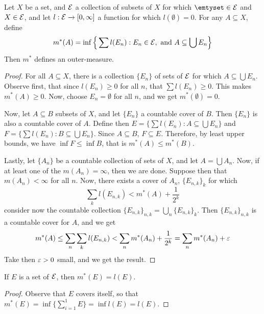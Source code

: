\begin{lemma}\label{lemma_1.3.1}
    Let $X$ be a set, and  $\mathcal{E}$ a collection of subsets of $X$ for which
    $\emtyset \in \Ec$ and $X \in \mathcal{E}$, and let $l:\mathcal{E} \xrightarrow{} [0, \infty]$
    a function for which $l(\emptyset)=0$. For any $A \subseteq X$, define
    \begin{equation}\label{equation_1.4}
        m^\ast(A)=\inf{\Big{\{} \sum{l(E_n)} : E_n \in \mathcal{E}, \text{ and }
       A \subseteq \bigcup{E_n} \Big{\}}}
    \end{equation}
    Then $m^\ast$ defines an outer-measure.
\end{lemma}
\begin{proof}
    For all $A \subseteq X$, there is a collection $\{E_n\}$ of sets of $\mathcal{E}$
    for which $A \subseteq \bigcup{E_n}$. Observe first, that since $l(E_n) \geq
    0$ for all $n$, that  $\sum{l(E_n)} \geq 0$. This makes $m^\ast(A) \geq 0$.
    Now, choose $E_n=\emptyset$ for all  $n$, and we get  $m^\ast(\emptyset)=0$.

    Now, let $A \subseteq B$ subsets of $X$, and let  $\{E_n\}$ a countable
    cover of $B$. Then  $\{E_n\}$ is also a countable cover of $A$. Define then
     $E=\{\sum{l(E_n)} : A \subseteq \bigcup{E_n}\}$ and $F=\{\sum{l(E_n)} :
     B \subseteq \bigcup{E_n}\}$. Since $A \subseteq B$, $F \subseteq E$.
     Therefore, by least upper bounds, we have $\inf{F} \leq \inf{B}$, that is
     $m^\ast(A) \leq m^\ast(B)$.

     Lastly, let $\{A_n\}$ be a countable collection of sets of $X$, and let
     $A=\bigcup{A_n}$. Now, if at least one of the $m(A_n)=\infty$, then we are
     done. Suppose then that $m(A_n)<\infty$ for all $n$. Now, there exists a
     cover of  $A_n$,  $\{E_{n,k}\}_k$ for which
     \begin{equation*}
         \sum_{k}{l(E_{n,k})}<m^\ast(A)+\frac{1}{2^k}
     \end{equation*}
     consider now the countable collection
     $\{E_{n,k}\}_{n,k}=\bigcup_{n}{\{E_{n,k}\}_k}$. Then $\{E_{n,k}\}_{n,k}$ is
     a countable cover for $A$, and we get
     \begin{equation*}
         m^\ast(A) \leq \sum_n{\sum_k{l(E_{n,k})}}<
         \sum_n{m^\ast(A_n)+\frac{1}{2^k}}=\sum_n{m^\ast(A_n)}+\varepsilon
     \end{equation*}
     Take then $\varepsilon>0$ small, and we get the result.
\end{proof}
\begin{corollary}
    If $E$ is a set of $\mathcal{E}$, then $m^\ast(E)=l(E)$.
\end{corollary}
\begin{proof}
    Observe that $E$ covers itself, so that
    $m^\ast(E)=\inf{\{\sum_{i=1}^1{E}\}}=\inf{l(E)}=l(E)$.
\end{proof}

